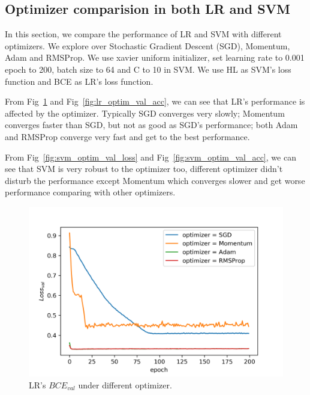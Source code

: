 \documentclass[journal, a4paper]{IEEEtran}
\begin{document}
\subsection{Optimizer comparision in both LR and SVM}
In this section, we compare the performance of LR and SVM with different optimizers. We explore over Stochastic Gradient Descent (SGD), Momentum, Adam and RMSProp. We use xavier uniform initializer, set learning rate to 0.001 epoch to 200, batch size to 64 and C to 10 in SVM. We use HL as SVM's loss function and BCE as LR's loss function.\par
From Fig~\ref{fig:lr_optim_val_loss} and Fig~\ref{fig:lr_optim_val_acc}, we can see that LR's performance is affected by the optimizer. Typically SGD converges very slowly; Momentum converges faster than SGD, but not as good as SGD's performance; both Adam and RMSProp converge very fast and get to the best performance.\par
From Fig~\ref{fig:svm_optim_val_loss} and Fig~\ref{fig:svm_optim_val_acc}, we can see that SVM is very robust to the optimizer too, different optimizer didn't disturb the performance except Momentum which converges slower and get worse performance comparing with other optimizers. \par

\begin{figure}[!hbt]
	\begin{center}
		\includegraphics[width=\columnwidth]{lr_optim_val_loss}
		\caption{LR's $BCE_{val}$ under different optimizer.}
		\label{fig:lr_optim_val_loss}
	\end{center}
\end{figure} \par
\end{document}
